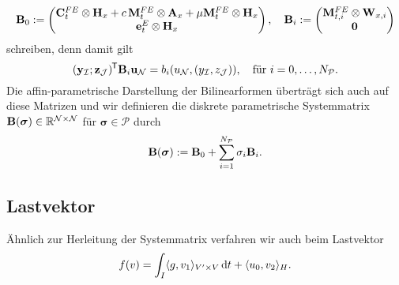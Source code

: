 \documentclass[../main.tex]{subfiles}
\begin{document}
\begin{equation}
    \mathbf{B}_{0} := \begin{pmatrix}
    \mathbf{C}_{t}^{FE} \otimes \mathbf{H}_{x} + c\,\mathbf{M}_{t}^{FE} \otimes \mathbf{A}_{x} + \mu \mathbf{M}_{t}^{FE} \otimes \mathbf{H}_{x} \\
    \mathbf{e}_{t}^{E} \otimes \mathbf{H}_{x}
    \end{pmatrix}, \quad
    \mathbf{B}_{i} :=  \begin{pmatrix}
    \mathbf{M}_{t,i}^{FE} \otimes \mathbf{W}_{x,i} \\
    \mathbf{0}
    \end{pmatrix}
\end{equation}
schreiben, denn damit gilt
\begin{equation}
    (\mathbf{y}_{\mathcal I}; \mathbf{z}_{\mathcal J})^{\mkern-1.5mu\mathsf{T}} \mathbf{B}_{i} \mathbf{u}_{\mathcal N} = b_{i}(u_{\mathcal N}, (y_{\mathcal I}, z_{\mathcal J})), \quad \text{für } i = 0, \dots, N_{\mathcal P}.
\end{equation}
Die affin-parametrische Darstellung der Bilinearformen überträgt sich auch auf diese Matrizen und wir definieren die diskrete parametrische Systemmatrix $\mathbf{B}(\bm \sigma) \in \mathbb{R}^{\mathcal N \times \mathcal N}$ für $\bm \sigma \in \mathcal P$ durch
\begin{equation}
    \mathbf{B}(\bm \sigma) := \mathbf{B}_{0} + \sum_{i = 1}^{N_{\mathcal P}} \sigma_{i} \mathbf{B}_{i}.
\end{equation}


\subsection*{Lastvektor} %

Ähnlich zur Herleitung der Systemmatrix verfahren wir auch beim Lastvektor
\begin{equation}
    f(v) = \int_{I} \langle g,v_{1}\rangle_{V' \times V} \mathop{}\!\mathrm{d} t + \langle u_{0},v_{2}\rangle_{H}.
\end{equation}
\end{document}
